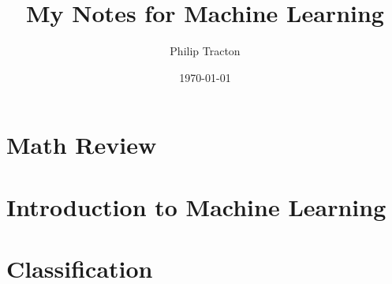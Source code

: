 \documentclass[12pt, svgnames, titlepage]{report}
\author{Philip Tracton}
\date{\today}
\date{}
\title{My Notes for Machine Learning}
\begin{document}
\maketitle
\newpage

\vspace{10mm}
\tableofcontents
\newpage

\chapter{Math Review}
\vspace{10mm}




\chapter{Introduction to Machine Learning}
\vspace{10mm}


\chapter{Classification}
\vspace{10mm}

\end{document}
